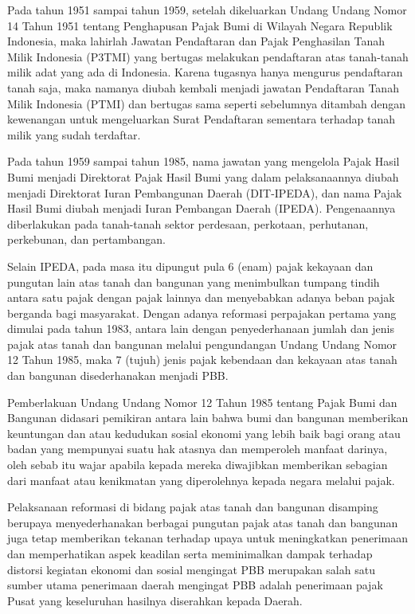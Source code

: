 \documentclass[pdftex,12pt, oneside]{article}
\begin{document}
Pada tahun 1951 sampai tahun 1959, setelah dikeluarkan Undang Undang Nomor 14 Tahun 1951 tentang Penghapusan Pajak Bumi di Wilayah Negara Republik Indonesia, maka lahirlah Jawatan Pendaftaran dan Pajak Penghasilan Tanah Milik Indonesia (P3TMI) yang bertugas melakukan pendaftaran atas tanah-tanah milik adat yang ada di Indonesia. Karena tugasnya hanya mengurus pendaftaran tanah saja, maka namanya diubah kembali menjadi jawatan Pendaftaran Tanah Milik Indonesia (PTMI) dan bertugas sama seperti sebelumnya ditambah dengan kewenangan untuk mengeluarkan Surat Pendaftaran sementara terhadap tanah milik yang sudah terdaftar.

Pada tahun 1959 sampai tahun 1985, nama jawatan yang mengelola Pajak Hasil Bumi menjadi Direktorat Pajak Hasil Bumi yang dalam pelaksanaannya diubah menjadi Direktorat Iuran Pembangunan Daerah (DIT-IPEDA), dan nama Pajak Hasil Bumi diubah menjadi Iuran Pembangan Daerah (IPEDA). Pengenaannya diberlakukan pada tanah-tanah sektor perdesaan, perkotaan, perhutanan, perkebunan, dan pertambangan.

Selain IPEDA, pada masa itu dipungut pula 6 (enam) pajak kekayaan dan pungutan lain atas tanah dan bangunan yang menimbulkan tumpang tindih antara satu pajak dengan pajak lainnya dan menyebabkan adanya beban pajak berganda bagi masyarakat. Dengan adanya reformasi perpajakan pertama yang dimulai pada tahun 1983, antara lain dengan penyederhanaan jumlah dan jenis pajak atas tanah dan bangunan melalui pengundangan Undang Undang Nomor 12 Tahun 1985, maka 7 (tujuh) jenis pajak kebendaan dan kekayaan atas tanah dan bangunan disederhanakan menjadi PBB.

Pemberlakuan Undang Undang Nomor 12 Tahun 1985 tentang Pajak Bumi dan Bangunan didasari pemikiran antara lain bahwa bumi dan bangunan memberikan keuntungan dan atau kedudukan sosial ekonomi yang lebih baik bagi orang atau badan yang mempunyai suatu hak atasnya dan memperoleh manfaat darinya, oleh sebab itu wajar apabila kepada mereka diwajibkan memberikan sebagian dari manfaat atau kenikmatan yang diperolehnya kepada negara melalui pajak.

Pelaksanaan reformasi di bidang pajak atas tanah dan bangunan disamping berupaya menyederhanakan berbagai pungutan pajak atas tanah dan bangunan juga tetap memberikan tekanan terhadap upaya untuk meningkatkan penerimaan dan memperhatikan aspek keadilan serta meminimalkan dampak terhadap distorsi kegiatan ekonomi dan sosial mengingat PBB merupakan salah satu sumber utama penerimaan daerah mengingat PBB adalah penerimaan pajak Pusat yang keseluruhan hasilnya diserahkan kepada Daerah.
\end{document}
